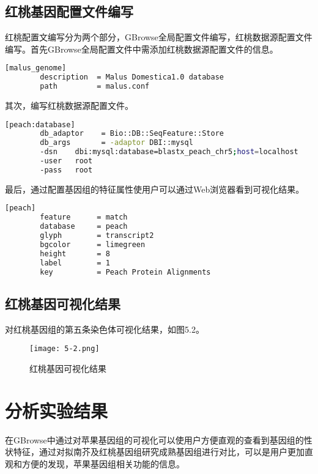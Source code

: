 		\subsection{红桃基因配置文件编写}
		红桃配置文编写分为两个部分，GBrowse全局配置文件编写，红桃数据源配置文件编写。首先GBrowse全局配置文件中需添加红桃数据源配置文件的信息。
		\begin{lstlisting}[language=bash]
		[malus_genome]
		description  = Malus Domestica1.0 database
		path         = malus.conf
		\end{lstlisting}
		其次，编写红桃数据源配置文件。
		\begin{lstlisting}[language=bash]
		[peach:database]
		db_adaptor    = Bio::DB::SeqFeature::Store
		db_args       = -adaptor DBI::mysql
		-dsn    dbi:mysql:database=blastx_peach_chr5;host=localhost
		-user   root
		-pass   root
		\end{lstlisting}
		最后，通过配置基因组的特征属性使用户可以通过Web浏览器看到可视化结果。
		\begin{lstlisting}[language=bash]
		[peach]
		feature      = match
		database     = peach
		glyph        = transcript2 
		bgcolor      = limegreen
		height       = 8
		label        = 1
		key          = Peach Protein Alignments
		\end{lstlisting}
		\subsection{红桃基因可视化结果}
		对红桃基因组的第五条染色体可视化结果，如图5.2。
		\begin{figure}[!ht]
			\centering
			\texttt{[image: 5-2.png]}
			\caption{红桃基因可视化结果}
		\end{figure}
	\section{分析实验结果}
	在GBrowse中通过对苹果基因组的可视化可以使用户方便直观的查看到基因组的性状特征，通过对拟南芥及红桃基因组研究成熟基因组进行对比，可以是用户更加直观和方便的发现，苹果基因组相关功能的信息。
	
		